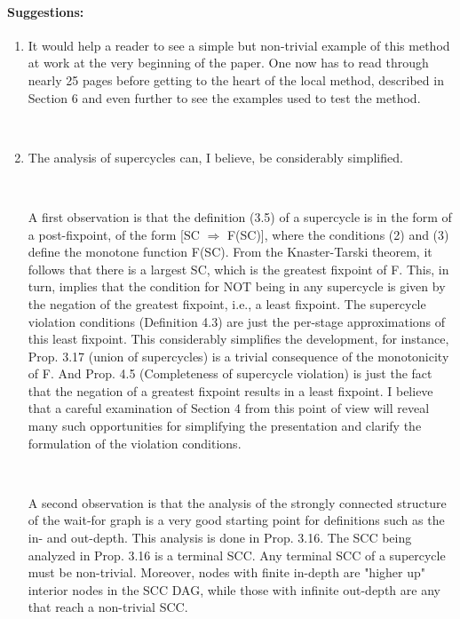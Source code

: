 \paragraph{Suggestions:}

\begin{enumerate}
\item It would help a reader to see a simple but non-trivial example of this method at work at the very beginning of the paper. One now has to read through nearly 25 pages before getting to the heart of the local method, described in Section 6 and even further to see the examples used to test the method.

~


\item The analysis of supercycles can, I believe, be considerably simplified.

~

  A first observation is that the definition (3.5) of a supercycle is in the form of a post-fixpoint, of the form [SC $\Rightarrow$ F(SC)],  where the conditions (2) and (3) define the monotone function F(SC). From the Knaster-Tarski theorem, it follows that there is a largest SC, which is the greatest fixpoint of F. This, in turn, implies that the condition for NOT being in any supercycle is given by the negation of the greatest fixpoint, i.e., a least fixpoint. The supercycle violation conditions (Definition 4.3) are just the per-stage approximations of this least fixpoint. This considerably simplifies the development, for instance, Prop. 3.17 (union of supercycles) is a trivial consequence of the monotonicity of F. And Prop. 4.5 (Completeness of supercycle violation) is just the fact that the negation of a greatest fixpoint results in a least fixpoint. I believe that a careful examination of Section 4 from this point of view will reveal many such opportunities for simplifying the presentation and clarify the formulation of the violation conditions.

~

  A second observation is that the analysis of the strongly connected structure of the wait-for graph is a very good starting point for definitions such as the in- and out-depth. This analysis is done in Prop. 3.16. The SCC being analyzed in Prop. 3.16 is a terminal SCC. Any terminal SCC of a supercycle must be non-trivial. Moreover, nodes with finite in-depth are "higher up" interior nodes in the SCC DAG, while those with infinite out-depth are any that reach a non-trivial SCC. 


\end{enumerate}
